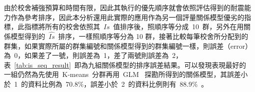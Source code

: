 
由於校舍補強預算和時間有限，因此其執行的優先順序就會依照評估得到的耐震能力作為參考排序，因此本分析還用此實際的應用作為另一個評量關係模型優劣的指標，此指標將所有的校舍依照其~$Is$~值排序後，照順序等分成~10~群，另外在用關係模型得到的~$\hat{Is}$~排序，一樣照順序等分為 10 群，接著比較每筆校舍所分配到的群集，如果實際所屬的群集編號和關係模型得到的群集編號一樣，則誤差（error）為~0，如果差了一號，則誤差為~1，差了兩號則誤差為~2，表~\ref{tab:is_seq_result}~即為九組關係模型的排序誤差結果。可以發現表現最好的一組仍然為先使用~K-means~分群再用~GLM~ 探勘所得到的關係模型，其誤差小於~1~的資料比例為~70.8\%，誤差小於~2~的資料比例則有~88.9\%~。

